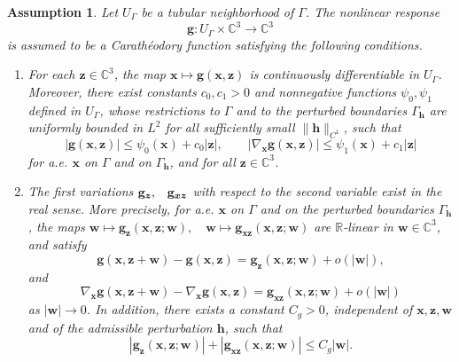 \documentclass[10pt,a4paper]{amsart}
\newtheorem{assu}{Assumption}
\numberwithin{equation}{section}
\begin{document}
\begin{assu}\label{ass:enhanced_g}
Let \(U_\Gamma\) be a tubular neighborhood of \(\Gamma\). The nonlinear
response
\[
\mathbf g:U_\Gamma\times\mathbb C^3\to\mathbb C^3
\]
is assumed to be a Carath\'eodory function satisfying the following
conditions.

\begin{enumerate}
\item[\textup{(A1)}]
For each \(\boldsymbol z\in\mathbb C^3\), the map
$\boldsymbol x\mapsto \mathbf g(\boldsymbol x,\boldsymbol z)$
is continuously differentiable in \(U_\Gamma\). Moreover, there exist
constants \(c_0,c_1>0\) and nonnegative functions
\(\psi_0,\psi_1\) defined in \(U_\Gamma\), whose restrictions to
\(\Gamma\) and to the perturbed boundaries \(\Gamma_{\mathbf h}\) are
uniformly bounded in \(L^2\) for all sufficiently small
\(\|\mathbf h\|_{C^1}\), such that
\[
|\mathbf g(\boldsymbol x,\boldsymbol z)|
\le
\psi_0(\boldsymbol x)+c_0|\boldsymbol z|,\qquad
|\nabla_{\boldsymbol x}\mathbf g(\boldsymbol x,\boldsymbol z)|
\le
\psi_1(\boldsymbol x)+c_1|\boldsymbol z|
\]
for a.e. \(\boldsymbol x\) on \(\Gamma\) and on \(\Gamma_{\mathbf h}\), and
for all \(\boldsymbol z\in\mathbb C^3\).

\item[\textup{(A2)}]
The first variations
$\mathbf g_{\boldsymbol z}\text,\quad
\mathbf g_{\boldsymbol x\boldsymbol z}$
with respect to the second variable exist in the real sense. More precisely,
for a.e. \(\boldsymbol x\) on \(\Gamma\) and on the perturbed boundaries
\(\Gamma_{\mathbf h}\), the maps
$
\boldsymbol w\mapsto
\mathbf g_{\boldsymbol z}(\boldsymbol x,\boldsymbol z;\boldsymbol w),
\quad
\boldsymbol w\mapsto
\mathbf g_{\boldsymbol x\boldsymbol z}
(\boldsymbol x,\boldsymbol z;\boldsymbol w)
$
are \(\mathbb R\)-linear in \(\boldsymbol w\in\mathbb C^3\), and satisfy
\[
\mathbf g(\boldsymbol x,\boldsymbol z+\boldsymbol w)
-
\mathbf g(\boldsymbol x,\boldsymbol z)
=
\mathbf g_{\boldsymbol z}
(\boldsymbol x,\boldsymbol z;\boldsymbol w)
+
o(|\boldsymbol w|),
\]
and
\[
\nabla_{\boldsymbol x}\mathbf g
(\boldsymbol x,\boldsymbol z+\boldsymbol w)
-
\nabla_{\boldsymbol x}\mathbf g
(\boldsymbol x,\boldsymbol z)
=
\mathbf g_{\boldsymbol x\boldsymbol z}
(\boldsymbol x,\boldsymbol z;\boldsymbol w)
+
o(|\boldsymbol w|)
\]
as \(|\boldsymbol w|\to0\). In addition, there exists a constant
\(C_g>0\), independent of \(\boldsymbol x,\boldsymbol z,\boldsymbol w\) and
of the admissible perturbation \(\mathbf h\), such that
\[
|\mathbf g_{\boldsymbol z}
(\boldsymbol x,\boldsymbol z;\boldsymbol w)|
+
|\mathbf g_{\boldsymbol x\boldsymbol z}
(\boldsymbol x,\boldsymbol z;\boldsymbol w)|
\le
C_g|\boldsymbol w|.
\]


\end{enumerate}
\end{assu}
\end{document}
